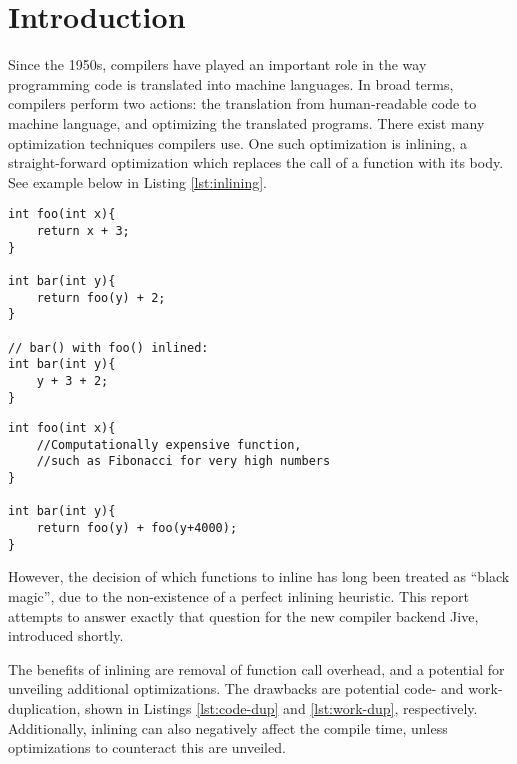 
\section{Introduction}
\label{introduction}

Since the 1950s, compilers have played an important role in the way programming
code is translated into machine languages. In broad terms, compilers perform two
actions: the translation from human-readable code to machine language, and
optimizing the translated programs. There exist many optimization techniques
compilers use. One such optimization is inlining, a straight-forward
optimization which replaces the call of a function with its body. See example
below in Listing \ref{lst:inlining}.

\begin{center}
	\noindent\begin{minipage}{0.48\textwidth}
		\begin{lstlisting}[label={lst:inlining}, style=customcpp,
caption={Function \textit{foo()} inlined into function \textit{bar()}.}]
int foo(int x){
	return x + 3;
}

int bar(int y){
	return foo(y) + 2;
}

// bar() with foo() inlined:
int bar(int y){
	y + 3 + 2;
}
		\end{lstlisting}
	\end{minipage}
	\noindent\begin{minipage}{0.48\textwidth}
		\begin{lstlisting}[label={lst:work-dup}, style=customcpp,
caption={Work duplication in \textit{bar()}, when inlining \textit{foo()} into
\textit{bar()} due to the calculation of \textit{foo(y)}.}]
int foo(int x){
	//Computationally expensive function,
	//such as Fibonacci for very high numbers
}

int bar(int y){
	return foo(y) + foo(y+4000);
}
		\end{lstlisting}
	\end{minipage}
\end{center}

However, the decision of which functions to inline has long been treated as
``black magic'', due to the non-existence of a perfect inlining heuristic. This
report attempts to answer exactly that question for the new compiler backend
Jive, introduced shortly.

The benefits of inlining are removal of function call overhead, and a potential
for unveiling additional optimizations. The drawbacks are potential code- and
work- duplication, shown in Listings \ref{lst:code-dup} and \ref{lst:work-dup},
respectively. Additionally, inlining can also negatively affect the compile
time, unless optimizations to counteract this are unveiled.

